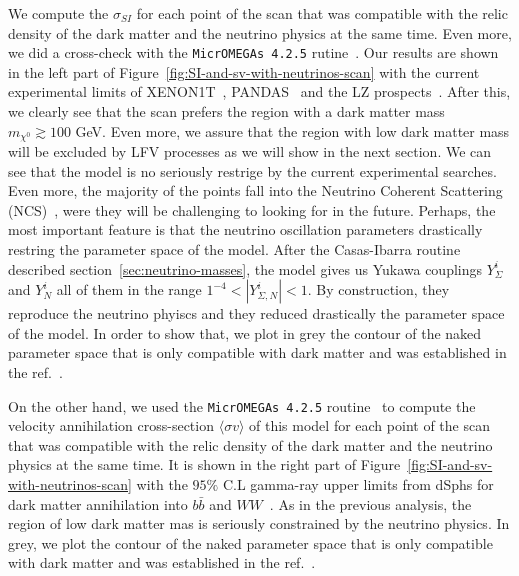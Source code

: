 \documentclass[12pt,letterpaper]{article}
\begin{document}
We compute the $\sigma_{SI}$ for each point of the scan that was compatible with the relic density of the dark matter and the neutrino physics at the same time. Even more, we did a cross-check with the \texttt{MicrOMEGAs 4.2.5} rutine~\cite{Belanger:2006is}. 
Our results are shown in the left part of Figure~\ref{fig:SI-and-sv-with-neutrinos-scan} with the current experimental limits of XENON1T~\cite{Aprile:2018dbl}, PANDAS~\cite{Cui:2017nnn} and the LZ prospects~\cite{Mount:2017qzi}. 
After this, we clearly see that the scan prefers the region with a dark matter mass $m_{\chi^0}\gtrsim 100$ GeV. 
Even more, we assure that the region with low dark matter mass will be excluded by LFV processes as we will show in the next section.
We can see that the model is no seriously restrige by the current experimental searches. Even more, the majority of the points fall into the Neutrino Coherent Scattering (NCS)~\cite{Cushman:2013zza, Billard:2013qya}, were they will be challenging to looking for in the future.
Perhaps, the most important feature is that the neutrino oscillation parameters drastically restring the parameter space of the model. 
After the Casas-Ibarra routine described section~\ref{sec:neutrino-masses}, the model gives us Yukawa couplings $Y_{\Sigma}^i$ and $Y_N^i$ all of them in the range $1^{-4}<|Y_{\Sigma, N}^i|<1$. By construction, they reproduce the neutrino phyiscs and they reduced drastically the parameter space of the model. In order to show that, we plot in grey the contour of the naked parameter space that is only compatible with dark matter and was established in the ref.~\cite{Hirsch:2013ola}.   

On the other hand, we used the \texttt{MicrOMEGAs 4.2.5} routine~\cite{Belanger:2006is} to compute the velocity annihilation cross-section $\langle \sigma v\rangle$ of this model for each point of the scan that was compatible with the relic density of the dark matter and the neutrino physics at the same time. 
It is shown in the right part of Figure~\ref{fig:SI-and-sv-with-neutrinos-scan} with the $95\%$ C.L gamma-ray upper limits from dSphs for dark matter annihilation into $b\bar{b}$ and $WW$~\cite{Ackermann:2015zua}.
As in the previous analysis, the region of low dark matter mas is seriously constrained by the neutrino physics. In grey, we plot the contour of the naked parameter space that is only compatible with dark matter and was established in the ref.~\cite{Hirsch:2013ola}.
\end{document}
